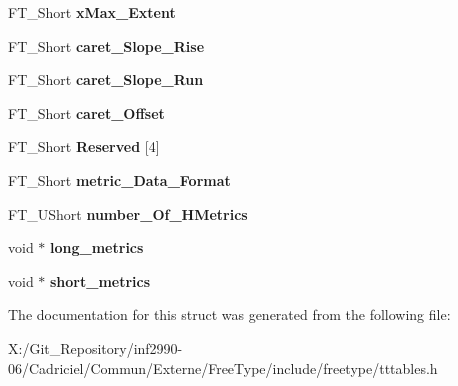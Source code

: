 \begin{DoxyCompactItemize}
\item 
\hypertarget{struct_t_t___hori_header___ab483cb323f9adc9d959209a42eb19957}{F\-T\-\_\-\-Short {\bfseries x\-Max\-\_\-\-Extent}}\label{struct_t_t___hori_header___ab483cb323f9adc9d959209a42eb19957}

\item 
\hypertarget{struct_t_t___hori_header___aeb43d92f56de424d8f28bd389973eca4}{F\-T\-\_\-\-Short {\bfseries caret\-\_\-\-Slope\-\_\-\-Rise}}\label{struct_t_t___hori_header___aeb43d92f56de424d8f28bd389973eca4}

\item 
\hypertarget{struct_t_t___hori_header___acce162ae0554006c11a3383bd3454d69}{F\-T\-\_\-\-Short {\bfseries caret\-\_\-\-Slope\-\_\-\-Run}}\label{struct_t_t___hori_header___acce162ae0554006c11a3383bd3454d69}

\item 
\hypertarget{struct_t_t___hori_header___a791ad767d54cc87e84d9b03d6739f0eb}{F\-T\-\_\-\-Short {\bfseries caret\-\_\-\-Offset}}\label{struct_t_t___hori_header___a791ad767d54cc87e84d9b03d6739f0eb}

\item 
\hypertarget{struct_t_t___hori_header___af2a2b374d8f81771fb75d3bdc96bcbf7}{F\-T\-\_\-\-Short {\bfseries Reserved} \mbox{[}4\mbox{]}}\label{struct_t_t___hori_header___af2a2b374d8f81771fb75d3bdc96bcbf7}

\item 
\hypertarget{struct_t_t___hori_header___a0ed857e9629d2dfb5350a6b5976bf933}{F\-T\-\_\-\-Short {\bfseries metric\-\_\-\-Data\-\_\-\-Format}}\label{struct_t_t___hori_header___a0ed857e9629d2dfb5350a6b5976bf933}

\item 
\hypertarget{struct_t_t___hori_header___aac3ecb9ba7c13436a663b91765e89647}{F\-T\-\_\-\-U\-Short {\bfseries number\-\_\-\-Of\-\_\-\-H\-Metrics}}\label{struct_t_t___hori_header___aac3ecb9ba7c13436a663b91765e89647}

\item 
\hypertarget{struct_t_t___hori_header___a3eeb5766b461e9563b659a30e775fcc2}{void $\ast$ {\bfseries long\-\_\-metrics}}\label{struct_t_t___hori_header___a3eeb5766b461e9563b659a30e775fcc2}

\item 
\hypertarget{struct_t_t___hori_header___ae39107c4cfc3e7c1871dbb304bbe4a5a}{void $\ast$ {\bfseries short\-\_\-metrics}}\label{struct_t_t___hori_header___ae39107c4cfc3e7c1871dbb304bbe4a5a}

\end{DoxyCompactItemize}


The documentation for this struct was generated from the following file\-:\begin{DoxyCompactItemize}
\item 
X\-:/\-Git\-\_\-\-Repository/inf2990-\/06/\-Cadriciel/\-Commun/\-Externe/\-Free\-Type/include/freetype/tttables.\-h\end{DoxyCompactItemize}

